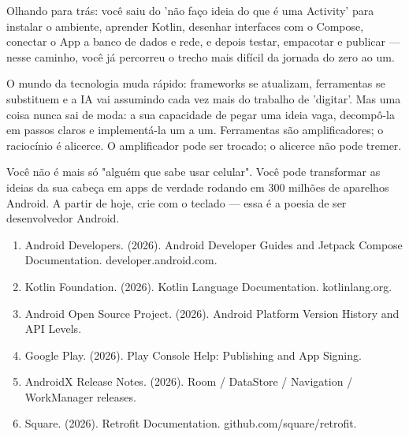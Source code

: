Olhando para trás: você saiu do 'não faço ideia do que é uma Activity' para instalar o ambiente, aprender Kotlin, desenhar interfaces com o Compose, conectar o App a banco de dados e rede, e depois testar, empacotar e publicar — nesse caminho, você já percorreu o trecho mais difícil da jornada do zero ao um.

O mundo da tecnologia muda rápido: frameworks se atualizam, ferramentas se substituem e a IA vai assumindo cada vez mais do trabalho de 'digitar'. Mas uma coisa nunca sai de moda: a sua capacidade de pegar uma ideia vaga, decompô-la em passos claros e implementá-la um a um. Ferramentas são amplificadores; o raciocínio é alicerce. O amplificador pode ser trocado; o alicerce não pode tremer.

Você não é mais só "alguém que sabe usar celular". Você pode transformar as ideias da sua cabeça em apps de verdade rodando em 300 milhões de aparelhos Android. A partir de hoje, crie com o teclado — essa é a poesia de ser desenvolvedor Android.


\begin{enumerate}
  \item Android Developers. (2026). Android Developer Guides and Jetpack Compose Documentation. developer.android.com.
  \item Kotlin Foundation. (2026). Kotlin Language Documentation. kotlinlang.org.
  \item Android Open Source Project. (2026). Android Platform Version History and API Levels.
  \item Google Play. (2026). Play Console Help: Publishing and App Signing.
  \item AndroidX Release Notes. (2026). Room / DataStore / Navigation / WorkManager releases.
  \item Square. (2026). Retrofit Documentation. github.com/square/retrofit.
\end{enumerate}
